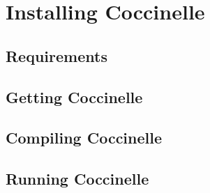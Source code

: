 \chapter{Installing Coccinelle}

\section{Requirements}

\section{Getting Coccinelle}

\section{Compiling Coccinelle}

\section{Running Coccinelle}


